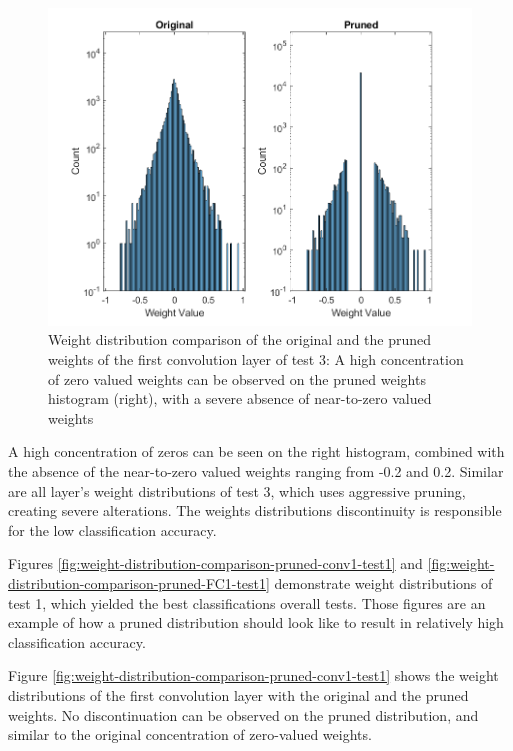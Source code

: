 \begin{figure} [H]
	\centering
	\includegraphics[width=\textwidth]{Images/Weights-distributions/pruned/41.22/weight-distribution-conv1.png}
	\decoRule
	\caption[Weight distribution comparison of the original and the pruned weights of the first convolution layer of test 3]{Weight distribution comparison of the original and the pruned weights of the first convolution layer  of test 3: A high concentration of zero valued weights can be observed on the pruned weights histogram (right), with a severe absence of near-to-zero valued weights}
	\label{fig:weight-distribution-comparison-pruned-conv1-test3}
\end{figure}

A high concentration of zeros can be seen on the right histogram, combined with the absence of the near-to-zero valued weights ranging from -0.2 and 0.2. Similar are all layer's weight distributions of test 3, which uses aggressive pruning, creating severe alterations. The weights distributions discontinuity is responsible for the low classification accuracy.

Figures \ref{fig:weight-distribution-comparison-pruned-conv1-test1} and \ref{fig:weight-distribution-comparison-pruned-FC1-test1} demonstrate weight distributions of test 1, which yielded the best classifications overall tests. Those figures are an example of how a pruned distribution should look like to result in relatively high classification accuracy.

Figure \ref{fig:weight-distribution-comparison-pruned-conv1-test1} shows the weight distributions of the first convolution layer with the original and the pruned weights. No discontinuation can be observed on the pruned distribution, and similar to the original concentration of zero-valued weights.


